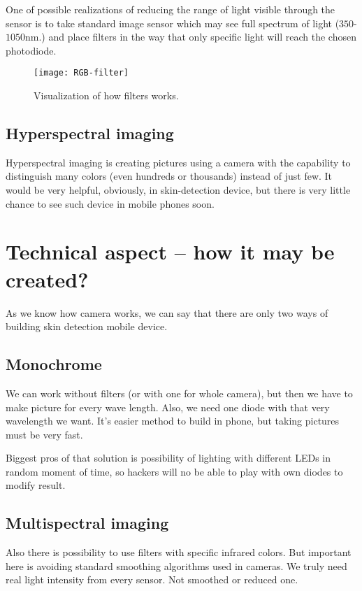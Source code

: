             One of possible realizations of reducing the range
            of light visible through the sensor is to take standard image sensor which
            may see full spectrum of light ($350$-$1050$nm.) and place filters
            in the way that only specific light will reach the chosen photodiode.

            \begin{figure}[H]
                \caption{Visualization of how filters works.}
                \centering
                \texttt{[image: RGB-filter]}
                \label{fig:RGB-filter}
            \end{figure}

        \subsection*{Hyperspectral imaging}
            Hyperspectral imaging is creating pictures using a camera with the
            capability to distinguish many colors
            (even hundreds or thousands) instead of just few.
            It would be very helpful, obviously, in skin-detection device,
            but there is very little chance to see such device in mobile phones soon.

    \section{Technical aspect -- how it may be created?}
        As we know how camera works, we can say that there are only two ways of
        building skin detection mobile device.
        \subsection*{Monochrome}
            We can work without filters (or with one for whole camera),
            but then we have to make picture for every wave length.
            Also, we need one diode with that very wavelength we want.
            It's easier method to build in phone, but taking pictures
            must be very fast.

            Biggest pros of that solution is possibility of lighting
            with different LEDs in random moment of time, so hackers
            will no be able to play with own diodes to modify result.

        \subsection*{Multispectral imaging}
            Also there is possibility to use filters with specific infrared colors.
            But important here is avoiding standard smoothing algorithms used
            in cameras. We truly need real light intensity from every sensor.
            Not smoothed or reduced one.

